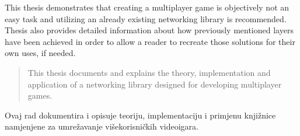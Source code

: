 \documentclass[times, utf8, diplomski]{fer}
\begin{document}
This thesis demonstrates that creating a multiplayer game is objectively not an easy task and utilizing an already existing networking library is recommended. Thesis also provides detailed information about how previously mentioned layers have been achieved in order to allow a reader to recreate those solutions for their own uses, if needed.



\clearpage

\begin{abstract}
This thesis documents and explains the theory, implementation and application of a networking library designed for developing multiplayer games.
	
\end{abstract}



\begin{sazetak}
Ovaj rad dokumentira i opisuje teoriju, implementaciju i primjenu knjižnice namjenjene za umrežavanje višekorisničkih videoigara.

\end{sazetak}
\end{document}
